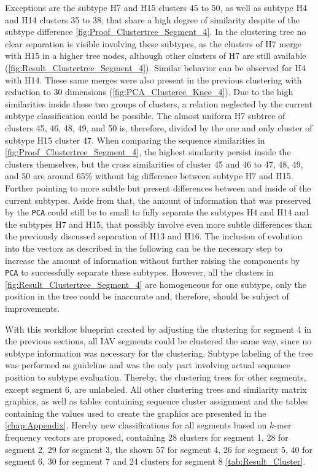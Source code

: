 \vspace{1em}

Exceptions are the subtype H7 and H15 clusters 45 to 50, as well as subtype H4 and H14 clusters 35 to 38, that share a high degree of similarity despite of the subtype difference \autoref{fig:Proof_Clustertree_Segment_4}. In the clustering tree no clear separation is visible involving these subtypes, as the clusters of H7 merge with H15 in a higher tree nodes, although other clusters of H7 are still available (\autoref{fig:Result_Clustertree_Segment_4}). Similar behavior can be observed for H4 with H14. These same merges were also present in the previous clustering with reduction to 30 dimensions (\autoref{fig:PCA_Clusteree_Knee_4}). Due to the high similarities inside these two groups of clusters, a relation neglected by the current subtype classification could be possible. The almost uniform H7 subtree of clusters 45, 46, 48, 49, and 50 is, therefore, divided by the one and only cluster of subtype H15 cluster 47. When comparing the sequence similarities in \autoref{fig:Proof_Clustertree_Segment_4}, the highest similarity persist inside the clusters themselves, but the cross similarities of cluster 45 and 46 to 47, 48, 49, and 50 are around 65\% without big difference between subtype H7 and H15. Further pointing to more subtle but present differences between and inside of the current subtypes. Aside from that, the amount of information that was preserved by the \texttt{PCA} could still be to small to fully separate the subtypes H4 and H14 and the subtypes H7 and H15, that possibly involve even more subtle differences than the previously discussed separation of H13 and H16. The inclusion of evolution into the vectors as described in the following can be the necessary step to increase the amount of information without further raising the components by \texttt{PCA} to successfully separate these subtypes. However, all the clusters in \autoref{fig:Result_Clustertree_Segment_4} are homogeneous for one subtype, only the position in the tree could be inaccurate and, therefore, should be subject of improvements.  

\vspace{1em}

With this workflow blueprint created by adjusting the clustering for segment 4 in the previous sections, all \gls{IAV} segments could be clustered the same way, since no subtype information was necessary for the clustering. Subtype labeling of the tree was performed as guideline and was the only part involving actual sequence position to subtype evaluation. Thereby, the clustering trees for other segments, except segment 6, are unlabeled. All other clustering trees and similarity matrix graphics, as well as tables containing sequence cluster assignment and the tables containing the values used to create the graphics are presented in the \autoref{chap:Appendix}. Hereby new classifications for all segments based on $k$-mer frequency vectors are proposed, containing 28 clusters for segment 1, 28 for segment 2, 29 for segment 3, the shown 57 for segment 4, 26 for segment 5, 40 for segment 6, 30 for segment 7 and 24 clusters for segment 8 \autoref{tab:Result_Cluster}. 

